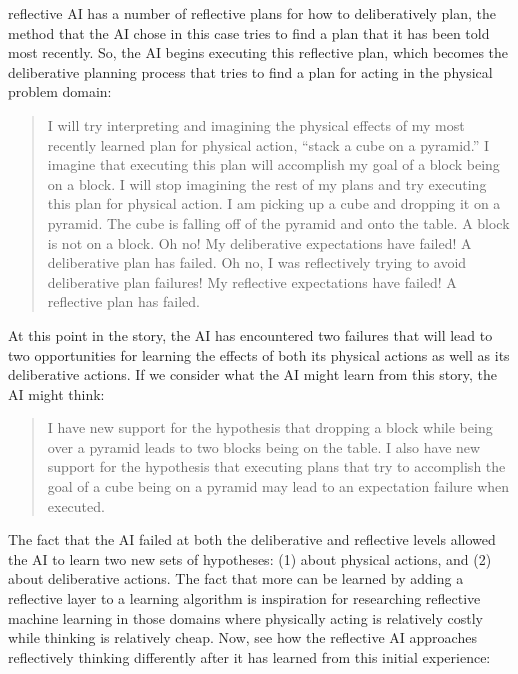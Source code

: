 reflective AI has a number of reflective plans for how to
deliberatively plan, the method that the AI chose in this case tries
to find a plan that it has been told most recently.  So, the AI begins
executing this reflective plan, which becomes the deliberative
planning process that tries to find a plan for acting in the physical
problem domain:
\begin{quote}
  I will try interpreting and imagining the physical effects of my
  most recently learned plan for physical action, ``stack a cube on a
  pyramid.''  I imagine that executing this plan will accomplish my
  goal of a block being on a block.  I will stop imagining the rest of
  my plans and try executing this plan for physical action.  I am
  picking up a cube and dropping it on a pyramid.  The cube is falling
  off of the pyramid and onto the table.  A block is not on a block.
  Oh no!  My deliberative expectations have failed!  A deliberative
  plan has failed.  Oh no, I was reflectively trying to avoid
  deliberative plan failures!  My reflective expectations have failed!
  A reflective plan has failed.
\end{quote}
At this point in the story, the AI has encountered two failures that
will lead to two opportunities for learning the effects of both its
physical actions as well as its deliberative actions.  If we consider
what the AI might learn from this story, the AI might think:
\begin{quote}
  I have new support for the hypothesis that dropping a block while
  being over a pyramid leads to two blocks being on the table.  I also
  have new support for the hypothesis that executing plans that try to
  accomplish the goal of a cube being on a pyramid may lead to an
  expectation failure when executed.
\end{quote}
The fact that the AI failed at both the deliberative and reflective
levels allowed the AI to learn two new sets of hypotheses: (1) about
physical actions, and (2) about deliberative actions.  The fact that
more can be learned by adding a reflective layer to a learning
algorithm is inspiration for researching reflective machine learning
in those domains where physically acting is relatively costly while
thinking is relatively cheap.  Now, see how the reflective AI
approaches reflectively thinking differently after it has learned from
this initial experience:

